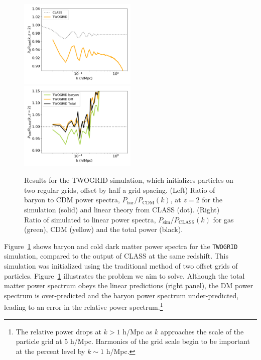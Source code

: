 \documentclass[a4paper,11pt]{article}
\begin{document}
\begin{figure}
  \includegraphics[width=0.5\textwidth]{plots/literature_2_relpower.pdf}
\includegraphics[width=0.5\textwidth]{plots/literature_2_class.pdf}
\caption{Results for the TWOGRID simulation, which initializes particles on two regular grids, offset by half a grid spacing. (Left) Ratio of baryon to CDM power spectra, $P_\mathrm{bar}/P_\mathrm{CDM}(k)$, at $z=2$ for the simulation (solid) and linear theory from CLASS (dot). (Right) Ratio of simulated to linear power spectra, $P_\mathrm{sim}/P_\mathrm{CLASS}(k)$ for gas (green), CDM (yellow) and the total power (black).}
  \label{fig:offsetgrids}
\end{figure}

Figure~\ref{fig:offsetgrids} shows baryon and cold dark matter power spectra for the \texttt{TWOGRID} simulation, compared to the output of CLASS at the same redshift. This simulation was initialized using the traditional method of two offset grids of particles. Figure~\ref{fig:offsetgrids} illustrates the problem we aim to solve. Although the total matter power spectrum obeys the linear predictions (right panel), the DM power spectrum is over-predicted and the baryon power spectrum under-predicted, leading to an error in the relative power spectrum.\footnote{The relative power drops at $k > 1$ h/Mpc as $k$ approaches the scale of the particle grid at $5$ h/Mpc. Harmonics of the grid scale begin to be important at the percent level by $k \sim 1$ h/Mpc.}
\end{document}
